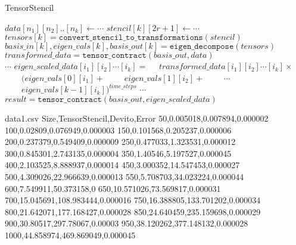 \documentclass{article}
\begin{document}
\begin{algorithm}[H]
\caption{TensorStencil}\label{euclid}
\begin{algorithmic}[1]
\State $\textit{data}[n_1][n_2]..[n_k] \gets \cdots$ 
\State $\textit{stencil}[k][2r+1] \gets \cdots$ \\
\State $\textit{tensors}[k] = \texttt{convert\_stencil\_to\_transformations}(\textit{stencil})$
\State $\textit{basis\_in}[k],\textit{eigen\_vals}[k], \textit{basis\_out}[k] = \texttt{eigen\_decompose}(\textit{tensors})$ \\
\State $\textit{transformed\_data} = \texttt{tensor\_contract}(\textit{basis\_out},\textit{data})$ \\
\State $\cdots$
\State $\textit{eigen\_scaled\_data}[i_1][i_2]\cdots[i_k] = $
\State $\quad \textit{transformed\_data}[i_1][i_2]\cdots[i_k] \times $
\State $\quad \quad (\textit{eigen\_vals}[0][i_1] + $
\State $\quad \quad \textit{eigen\_vals}[1][i_2] + $
\State $\quad \quad \cdots$
\State $\quad \quad \textit{eigen\_vals}[k-1][i_k])^{\textit{time\_steps}}$
\EndFor 
\State $\cdots$
\EndFor 
\EndFor \\
\State $\textit{result} = \texttt{tensor\_contract}(\textit{basis\_out},\textit{eigen\_scaled\_data})$
\end{algorithmic}
\end{algorithm}

\begin{filecontents*}{data1.csv}
	Size,TensorStencil,Devito,Error
	50,0.005018,0.007894,0.000002
	100,0.02809,0.076949,0.000003
	150,0.101568,0.205237,0.000006
	200,0.237379,0.549409,0.000009
	250,0.477033,1.323531,0.000012
	300,0.845301,2.743135,0.000004
	350,1.40546,5.197527,0.000045
	400,2.103525,8.888937,0.000014
	450,3.000352,14.547453,0.000027
	500,4.309026,22.966639,0.000013
	550,5.708703,34.023224,0.000044
	600,7.549911,50.373158,0
	650,10.571026,73.569817,0.000031
	700,15.045691,108.983444,0.000016
	750,16.388805,133.701202,0.000034
	800,21.642071,177.168427,0.000028
	850,24.640459,235.159698,0.000029
	900,30.80517,297.78067,0.00003
	950,38.120262,377.148132,0.000028
	1000,44.858974,469.869049,0.000045
\end{filecontents*}


\end{document}
